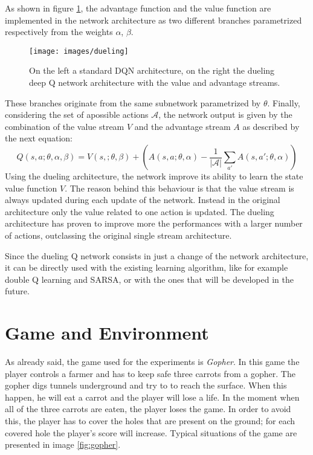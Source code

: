 \documentclass[article,11pt]{article}
\begin{document}
	As shown in figure \ref{fig:dueling}, the advantage function and the value function are implemented in the network architecture as two different branches parametrized respectively from the weights $\alpha$, $\beta$.
	\begin{figure}
		\centering
		\texttt{[image: images/dueling]}
		\caption{On the left a standard DQN architecture, on the right the dueling deep Q network architecture with the value and advantage streams. }
		\label{fig:dueling}
	\end{figure}
	These branches originate from the same subnetwork parametrized by $\theta$.	Finally, considering the set of apossible actions $\mathcal{A}$, the network output is given by the combination of the value stream $V$ and the advantage stream $A$ as described by the next equation:
	\begin{equation}
		\label{eq:dueling}
		Q(s, a; \theta, \alpha, \beta) = V(s,;\theta, \beta) + \left( A(s,a;\theta,\alpha) - \dfrac{1}{|\mathcal{A}|} \sum_{a'}^{} A(s, a'; \theta,\alpha) \right)
	\end{equation}
	Using the dueling architecture, the network improve its ability to learn the state value function $V$. The reason behind this behaviour is that the value stream is always updated during each update of the network. Instead in the original architecture only the value related to one action is updated. The dueling architecture has proven to improve more the performances with a larger number of actions, outclassing the original single stream architecture.
	
	Since the dueling Q network consists in just a change of the network architecture, it can be directly used with the existing learning algorithm, like for example double Q learning and SARSA, or with the ones that will be developed in the future.
	
	\section{Game and Environment}
	As already said, the game used for the experiments is \textit{Gopher}. In this game the player controls a farmer and has to keep safe three carrots from a gopher. The gopher digs tunnels underground and try to to reach the surface. When this happen, he will eat a carrot and the player will lose a life. In the moment when all of the three carrots are eaten, the player loses the game. In order to avoid this, the player has to cover the holes that are present on the ground; for each covered hole the player's score will increase. Typical situations of the game are presented in image \ref{fig:gopher}.
	
\end{document}
